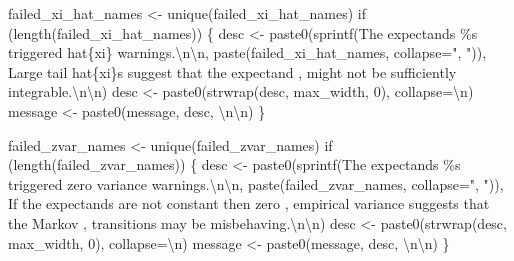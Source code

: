 \documentclass[
  letterpaper,
  DIV=11,
  numbers=noendperiod]{scrartcl}
\newenvironment{Shaded}{\begin{snugshade}}{\end{snugshade}}
\newcommand{\CharTok}[1]{\textcolor[rgb]{0.13,0.47,0.30}{#1}}
\newcommand{\ControlFlowTok}[1]{\textcolor[rgb]{0.00,0.23,0.31}{#1}}
\newcommand{\DecValTok}[1]{\textcolor[rgb]{0.68,0.00,0.00}{#1}}
\newcommand{\NormalTok}[1]{\textcolor[rgb]{0.00,0.23,0.31}{#1}}
\newcommand{\OperatorTok}[1]{\textcolor[rgb]{0.37,0.37,0.37}{#1}}
\newcommand{\SpecialCharTok}[1]{\textcolor[rgb]{0.37,0.37,0.37}{#1}}
\newcommand{\StringTok}[1]{\textcolor[rgb]{0.13,0.47,0.30}{#1}}
\begin{document}
\begin{Shaded}
\begin{Highlighting}[]
\NormalTok{  failed\_xi\_hat\_names }\OperatorTok{\textless{}{-}}\NormalTok{ unique(failed\_xi\_hat\_names)}
  \ControlFlowTok{if}\NormalTok{ (length(failed\_xi\_hat\_names)) \{}
\NormalTok{    desc }\OperatorTok{\textless{}{-}} 
\NormalTok{      paste0(sprintf(}\StringTok{\textquotesingle{}The expectands }\SpecialCharTok{\%s}\StringTok{ triggered hat}\SpecialCharTok{\{xi\}}\StringTok{ warnings.}\CharTok{\textbackslash{}n\textbackslash{}n}\StringTok{\textquotesingle{}}\NormalTok{,}
\NormalTok{             paste(failed\_xi\_hat\_names, collapse}\OperatorTok{=}\StringTok{", "}\NormalTok{)),}
             \StringTok{\textquotesingle{}  Large tail hat}\SpecialCharTok{\{xi\}}\StringTok{s suggest that the expectand \textquotesingle{}}\NormalTok{,}
             \StringTok{\textquotesingle{}might not be sufficiently integrable.}\CharTok{\textbackslash{}n\textbackslash{}n}\StringTok{\textquotesingle{}}\NormalTok{)}
\NormalTok{    desc }\OperatorTok{\textless{}{-}}\NormalTok{ paste0(strwrap(desc, max\_width, }\DecValTok{0}\NormalTok{), collapse}\OperatorTok{=}\StringTok{\textquotesingle{}}\CharTok{\textbackslash{}n}\StringTok{\textquotesingle{}}\NormalTok{)}
\NormalTok{    message }\OperatorTok{\textless{}{-}}\NormalTok{ paste0(message, desc, }\StringTok{\textquotesingle{}}\CharTok{\textbackslash{}n\textbackslash{}n}\StringTok{\textquotesingle{}}\NormalTok{)}
\NormalTok{  \}}
        
\NormalTok{  failed\_zvar\_names }\OperatorTok{\textless{}{-}}\NormalTok{ unique(failed\_zvar\_names)}
  \ControlFlowTok{if}\NormalTok{ (length(failed\_zvar\_names)) \{ }
\NormalTok{    desc }\OperatorTok{\textless{}{-}} 
\NormalTok{      paste0(sprintf(}\StringTok{\textquotesingle{}The expectands }\SpecialCharTok{\%s}\StringTok{ triggered zero variance warnings.}\CharTok{\textbackslash{}n\textbackslash{}n}\StringTok{\textquotesingle{}}\NormalTok{,}
\NormalTok{             paste(failed\_zvar\_names, collapse}\OperatorTok{=}\StringTok{", "}\NormalTok{)),}
             \StringTok{\textquotesingle{}  If the expectands are not constant then zero \textquotesingle{}}\NormalTok{,}
             \StringTok{\textquotesingle{}empirical variance suggests that the Markov \textquotesingle{}}\NormalTok{,}
             \StringTok{\textquotesingle{}transitions may be misbehaving.}\CharTok{\textbackslash{}n\textbackslash{}n}\StringTok{\textquotesingle{}}\NormalTok{)}
\NormalTok{    desc }\OperatorTok{\textless{}{-}}\NormalTok{ paste0(strwrap(desc, max\_width, }\DecValTok{0}\NormalTok{), collapse}\OperatorTok{=}\StringTok{\textquotesingle{}}\CharTok{\textbackslash{}n}\StringTok{\textquotesingle{}}\NormalTok{)}
\NormalTok{    message }\OperatorTok{\textless{}{-}}\NormalTok{ paste0(message, desc, }\StringTok{\textquotesingle{}}\CharTok{\textbackslash{}n\textbackslash{}n}\StringTok{\textquotesingle{}}\NormalTok{)}
\NormalTok{  \}}
  

\end{Highlighting}
\end{Shaded}
\end{document}

